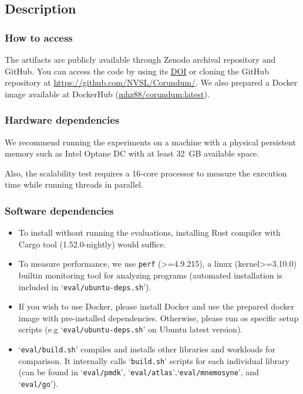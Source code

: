 {%
\subsection{Description}

\subsubsection{How to access}

The artifacts are publicly available
through Zenodo archival repository and GitHub. You can access the code by using its \href{https://zenodo.org/record/4321062}{DOI} or cloning the GitHub repository at \href{https://github.com/NVSL/Corundum/}{https://github.com/NVSL/Corundum/}.
We also prepared a Docker image available at DockerHub (\href{https://hub.docker.com/r/mhz88/corundum}{mhz88/corundum:latest}).

\subsubsection{Hardware dependencies}

We recommend running the experiments on a machine with a physical persistent memory such as Intel Optane DC with at least 32~GB available space.

Also, the scalability test requires a 16-core processor to measure the execution time while running threads in parallel.

\subsubsection{Software dependencies}

\begin{itemize}
  \item To install \This{} without running the evaluations, installing Rust compiler with Cargo tool (1.52.0-nightly) would suffice.
  \item To measure performance, we use \verb+perf+ (>=4.9.215), a linux (kernel>=3.10.0) builtin monitoring tool for analyzing programs (automated installation is included in `\verb+eval/ubuntu-deps.sh+').
  \item If you wish to use Docker, please install Docker and use the prepared docker image with pre-installed dependencies. Otherwise, please run os specific setup scripts (e.g `\verb+eval/ubuntu-deps.sh+' on Ubuntu latest version).
  \item `\verb+eval/build.sh+' compiles and installs other libraries and workloads for comparison. It internally calls `\verb+build.sh+' scripts for each individual library (can be found in `\verb+eval/pmdk+', `\verb+eval/atlas+',\linebreak`\verb+eval/mnemosyne+', and `\verb+eval/go+').
\end{itemize}

}
